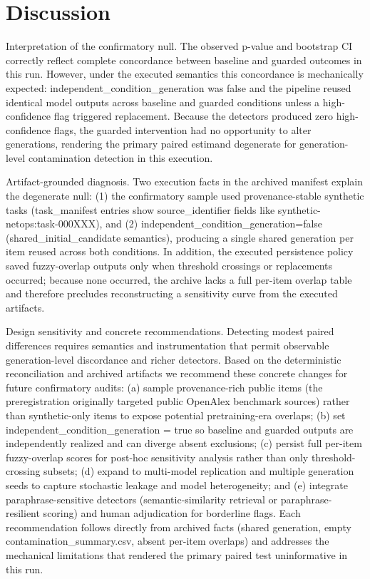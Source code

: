 \documentclass[conference]{IEEEtran}
\begin{document}
\section{Discussion}
Interpretation of the confirmatory null. The observed p-value and bootstrap CI correctly reflect complete concordance between baseline and guarded outcomes in this run. However, under the executed semantics this concordance is mechanically expected: independent\_condition\_generation was false and the pipeline reused identical model outputs across baseline and guarded conditions unless a high-confidence flag triggered replacement. Because the detectors produced zero high-confidence flags, the guarded intervention had no opportunity to alter generations, rendering the primary paired estimand degenerate for generation-level contamination detection in this execution.

Artifact-grounded diagnosis. Two execution facts in the archived manifest explain the degenerate null: (1) the confirmatory sample used provenance-stable synthetic tasks (task\_manifest entries show source\_identifier fields like synthetic-netops:task-000XXX), and (2) independent\_condition\_generation=false (shared\_initial\_candidate semantics), producing a single shared generation per item reused across both conditions. In addition, the executed persistence policy saved fuzzy-overlap outputs only when threshold crossings or replacements occurred; because none occurred, the archive lacks a full per-item overlap table and therefore precludes reconstructing a sensitivity curve from the executed artifacts.

Design sensitivity and concrete recommendations. Detecting modest paired differences requires semantics and instrumentation that permit observable generation-level discordance and richer detectors. Based on the deterministic reconciliation and archived artifacts we recommend these concrete changes for future confirmatory audits: (a) sample provenance-rich public items (the preregistration originally targeted public OpenAlex benchmark sources) rather than synthetic-only items to expose potential pretraining-era overlaps; (b) set independent\_condition\_generation = true so baseline and guarded outputs are independently realized and can diverge absent exclusions; (c) persist full per-item fuzzy-overlap scores for post-hoc sensitivity analysis rather than only threshold-crossing subsets; (d) expand to multi-model replication and multiple generation seeds to capture stochastic leakage and model heterogeneity; and (e) integrate paraphrase-sensitive detectors (semantic-similarity retrieval or paraphrase-resilient scoring) and human adjudication for borderline flags. Each recommendation follows directly from archived facts (shared generation, empty contamination\_summary.csv, absent per-item overlaps) and addresses the mechanical limitations that rendered the primary paired test uninformative in this run.
\end{document}
